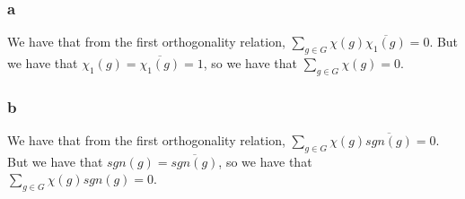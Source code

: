 \documentclass[]{article}
\begin{document}
\subsubsection*{a}
We have that from the first orthogonality relation,
$\sum_{g \in G} \chi(g) \overline{\chi_1(g)} = 0$. But we have that $\chi_1(g) = \overline{\chi_1(g)} = 1$, so we have that $\sum_{g \in G} \chi(g) = 0$. 

\subsubsection*{b}
We have that from the first orthogonality relation,
$\sum_{g \in G} \chi(g) \overline{sgn(g)} = 0$. But we have that $sgn(g) = \overline{sgn(g)}$, so we have that $\sum_{g \in G} \chi(g)sgn(g) = 0$. 
%
\end{document}
